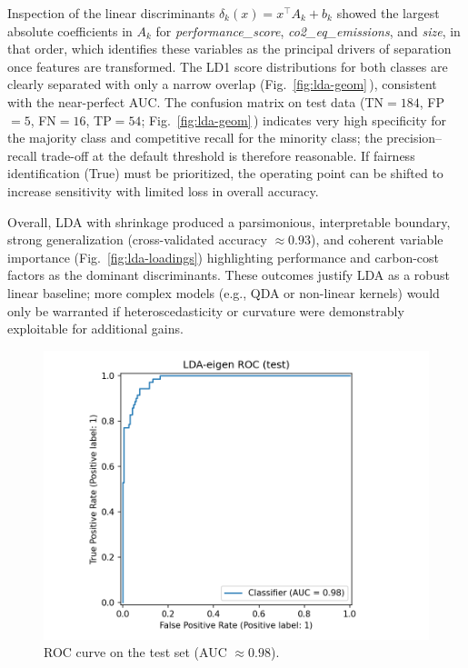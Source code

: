 \documentclass[journal]{IEEEtran}
\begin{document}
Inspection of the linear discriminants $\delta_k(x)=x^\top A_k+b_k$ showed the largest absolute coefficients in $A_k$ for \emph{performance\_score}, \emph{co2\_eq\_emissions}, and \emph{size}, in that order, which identifies these variables as the principal drivers of separation once features are transformed. The LD1 score distributions for both classes are clearly separated with only a narrow overlap (Fig.~\ref{fig:lda-geom}\,), consistent with the near-perfect AUC. The confusion matrix on test data (TN$=184$, FP$=5$, FN$=16$, TP$=54$; Fig.~\ref{fig:lda-geom}\,) indicates very high specificity for the majority class and competitive recall for the minority class; the precision--recall trade-off at the default threshold is therefore reasonable. If fairness identification (True) must be prioritized, the operating point can be shifted to increase sensitivity with limited loss in overall accuracy.

Overall, LDA with shrinkage produced a parsimonious, interpretable boundary, strong generalization (cross-validated accuracy $\approx0.93$), and coherent variable importance (Fig.~\ref{fig:lda-loadings}) highlighting performance and carbon-cost factors as the dominant discriminants. These outcomes justify LDA as a robust linear baseline; more complex models (e.g., QDA or non-linear kernels) would only be warranted if heteroscedasticity or curvature were demonstrably exploitable for additional gains.

\begin{figure}[H]
	\centering
	\includegraphics[width=.72\linewidth]{assets/LDA-eigen_roc_test.png}
	\caption{ROC curve on the test set (AUC $\approx 0.98$).}
	\label{fig:lda-roc}
\end{figure}
\end{document}
